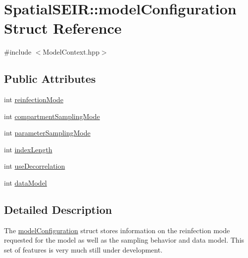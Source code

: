 \hypertarget{structSpatialSEIR_1_1modelConfiguration}{\section{Spatial\-S\-E\-I\-R\-:\-:model\-Configuration Struct Reference}
\label{structSpatialSEIR_1_1modelConfiguration}
}


{\ttfamily \#include $<$Model\-Context.\-hpp$>$}

\subsection*{Public Attributes}
\begin{DoxyCompactItemize}
\item 
int \hyperlink{structSpatialSEIR_1_1modelConfiguration_a14311a125d9d1f81988468d7c7cab053}{reinfection\-Mode}
\item 
int \hyperlink{structSpatialSEIR_1_1modelConfiguration_ad1c1d1f892bda73f6c039013eaa507fe}{compartment\-Sampling\-Mode}
\item 
int \hyperlink{structSpatialSEIR_1_1modelConfiguration_a77124442818744ed7201f5345f7d5592}{parameter\-Sampling\-Mode}
\item 
int \hyperlink{structSpatialSEIR_1_1modelConfiguration_a61296ec50b9020b198d9630cef4f4b3e}{index\-Length}
\item 
int \hyperlink{structSpatialSEIR_1_1modelConfiguration_aadf8335bc1ebcd6cef1b21259fe35582}{use\-Decorrelation}
\item 
int \hyperlink{structSpatialSEIR_1_1modelConfiguration_aecfb1421025e725f13945049e00298ff}{data\-Model}
\end{DoxyCompactItemize}


\subsection{Detailed Description}
The \hyperlink{structSpatialSEIR_1_1modelConfiguration}{model\-Configuration} struct stores information on the reinfection mode requested for the model as well as the sampling behavior and data model. This set of features is very much still under development. 

